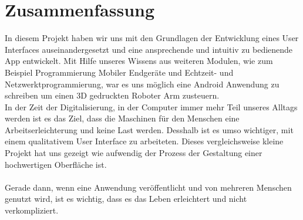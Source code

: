 \documentclass[12pt,					%
							 oneside,			%
							 a4paper,			%
							 halfparskip,		%
							 liststotoc,			%
							 bibtotoc,			%
							 fleqn,				%
							 pointlessnumbers]	%
							 {scrreprt}
\begin{document}
\chapter{Zusammenfassung}	
In diesem Projekt haben wir uns mit den Grundlagen der Entwicklung eines User Interfaces auseinandergesetzt und eine ansprechende und intuitiv zu bedienende App entwickelt. Mit Hilfe unseres Wissens aus weiteren Modulen, wie zum Beispiel \glqq{}Programmierung Mobiler Endgeräte\grqq{} und \glqq{}Echtzeit- und Netzwerktprogrammierung\grqq{}, war es uns möglich eine Android Anwendung zu schreiben um einen 3D gedruckten Roboter Arm zusteuern. 
\\
In der Zeit der Digitalisierung, in der Computer immer mehr Teil unseres Alltags werden ist es das Ziel, dass die Maschinen für den Menschen eine Arbeitserleichterung und keine Last werden. Desshalb ist es umso wichtiger, mit einem qualitativem User Interface zu arbeiteten. Dieses vergleichsweise kleine Projekt hat uns gezeigt wie aufwendig der Prozess der Gestaltung einer hochwertigen Oberfläche ist.\\ \\
Gerade dann, wenn eine Anwendung veröffentlicht und von mehreren Menschen genutzt wird, ist es wichtig, dass es das Leben erleichtert und nicht verkompliziert.


	
	
	\nocite{*}						%
	

	\listoffigures						%

	\appendix
	
\end{document}
